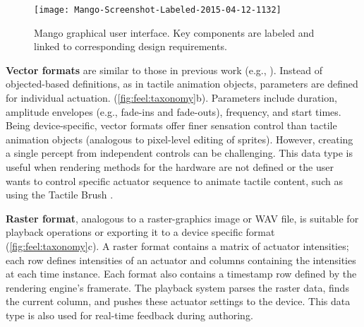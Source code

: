\begin{figure}[tbh] %
   \centering
   \texttt{[image: Mango-Screenshot-Labeled-2015-04-12-1132]} 
   \caption{Mango graphical user interface. Key components are labeled and linked to corresponding design requirements.}
   \label{fig:implementation:screenshot}
\end{figure}

\textbf{Vector formats} are similar to those in previous work (e.g., \cite{Enriquez2003}).
Instead of objected-based definitions, as in tactile animation objects, parameters are defined for individual actuation. %
(\autoref{fig:feel:taxonomy}b).
Parameters include duration, amplitude envelopes (e.g., fade-ins and fade-outs), frequency, and start times.
Being device-specific, vector formats %
offer finer sensation control than tactile animation objects (analogous to pixel-level editing of sprites).
However, creating a single percept from independent controls can be challenging.
This data type is useful when rendering methods for the hardware are not defined or the user wants to control specific actuator sequence to animate tactile content, such as using the Tactile Brush \cite{Israr2011a}. 

\textbf{Raster format}, analogous to a raster-graphics image or WAV file, is suitable for playback operations or exporting it to a device specific format (\autoref{fig:feel:taxonomy}c).
A raster format contains a matrix of actuator intensities; each row defines intensities of an actuator and columns containing the intensities at each time instance. Each format also contains a timestamp row defined by the rendering engine's framerate.  
The playback system parses the raster data, finds the current column, and pushes these actuator settings to the device. %
This data type is also used for real-time feedback during authoring.





